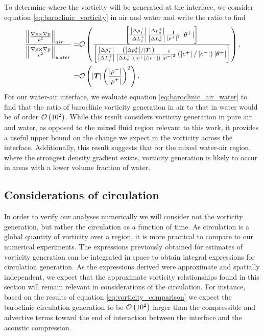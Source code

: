 To determine where the vorticity will be generated at the interface,
we consider equation \eqref{eq:baroclinic_vorticity} in air and water
and write the ratio to find
\begin{align}%
\label{eq:baroclinic_air_water}%
\frac{\norm{\frac{\nabla\rho\times\nabla p}{\rho^2}}_{air\quad}}{\norm{\frac{\nabla\rho\times\nabla p}{\rho^2}}_{water}}
=&\orderof{\frac{\left[\frac{\abs{\Delta \rho_I^+}}{\abs{\Delta L_I^+}}\frac{\abs{\Delta p_a^+}}{\abs{\Delta L_a^+}}\frac{1}{\abs{\rho^+}^2}\abs{\theta^+}\right]}
{\left[\frac{\abs{\Delta \rho_I^+}}{\abs{\Delta L_I^+}}\frac{\left(\abs{\Delta p_a^+}/\abs{\bs{T}}\right)}{\abs{\Delta L_a^+}\left(\abs{c^+}/\abs{c^-}\right)}\frac{1}{\abs{\rho^-}^2}\left(\abs{c^+}/\abs{c^-}\right)\abs{\theta^+}\right]}},\nonumber\\%
=&\orderof{\abs{\bs{T}}\left(\frac{\abs{\rho^-}}{\abs{\rho^+}}\right)^2}.%
\end{align}
For our water-air interface, we evaluate equation
\eqref{eq:baroclinic_air_water} to find that the ratio of baroclinic
vorticity generation in air to that in water would be of order
$\mathcal{O}\left(10^2\right)$. While this result considers vorticity generation in
pure air and water, as opposed to the mixed fluid region relevant to
this work, it provides a useful upper bound on the change we expect in
the vorticity across the interface. Additionally, this result suggests
that for the mixed water-air region, where the strongest density
gradient exists, vorticity generation is likely to occur in areas with
a lower volume fraction of water.

\subsection{Considerations of circulation}
In order to verify our analyses numerically we will consider not the
vorticity generation, but rather the circulation as a function of
time. As circulation is a global quantity of vorticity over a region,
it is more practical to compare to our numerical experiments. The
expressions previously obtained for estimates of vorticity generation
can be integrated in space to obtain integral expressions for
circulation generation. As the expressions derived were approximate
and spatially independent, we expect that the approximate vorticity
relationships found in this section will remain relevant in
considerations of the circulation.  For instance, based on the results
of equation \eqref{eq:vorticity_comparison} we expect the baroclinic
circulation generation to be $\mathcal{O}\left(10^2\right)$ larger than the
compressible and advective terms toward the end of interaction between
the interface and the acoustic compression.

